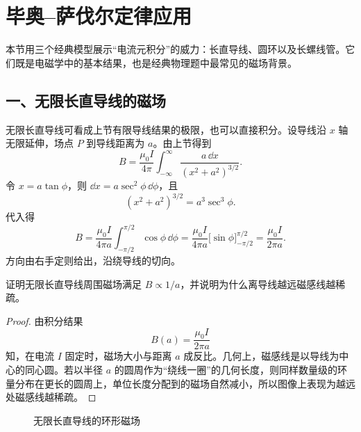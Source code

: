 \section{毕奥--萨伐尔定律应用}

本节用三个经典模型展示“电流元积分”的威力：长直导线、圆环以及长螺线管。它们既是电磁学中的基本结果，也是经典物理题中最常见的磁场背景。

\subsection*{一、无限长直导线的磁场}

无限长直导线可看成上节有限导线结果的极限，也可以直接积分。设导线沿 $x$ 轴无限延伸，场点 $P$ 到导线距离为 $a$。由上节得到
\[
  B=\frac{\mu_0 I}{4\pi}\int_{-\infty}^{\infty}\frac{a\,\dd x}{(x^2+a^2)^{3/2}}.
\]
令 $x=a\tan\phi$，则 $\dd x=a\sec^2\phi\,\dd\phi$，且
\[
  (x^2+a^2)^{3/2}=a^3\sec^3\phi.
\]
代入得
\[
  B=\frac{\mu_0 I}{4\pi a}\int_{-\pi/2}^{\pi/2}\cos\phi\,\dd\phi
  =\frac{\mu_0 I}{4\pi a}\bigl[\sin\phi\bigr]_{-\pi/2}^{\pi/2}
  =\frac{\mu_0 I}{2\pi a}.
\]
方向由右手定则给出，沿绕导线的切向。

\begin{example}
证明无限长直导线周围磁场满足 $B\propto 1/a$，并说明为什么离导线越远磁感线越稀疏。
\end{example}

\begin{proof}
由积分结果
\[
  B(a)=\frac{\mu_0 I}{2\pi a}
\]
知，在电流 $I$ 固定时，磁场大小与距离 $a$ 成反比。几何上，磁感线是以导线为中心的同心圆。若以半径 $a$ 的圆周作为“绕线一圈”的几何长度，则同样数量级的环量分布在更长的圆周上，单位长度分配到的磁场自然减小，所以图像上表现为越远处磁感线越稀疏。
\end{proof}

\begin{figure}[H]
\centering
{}
\caption{无限长直导线的环形磁场}
\end{figure}


